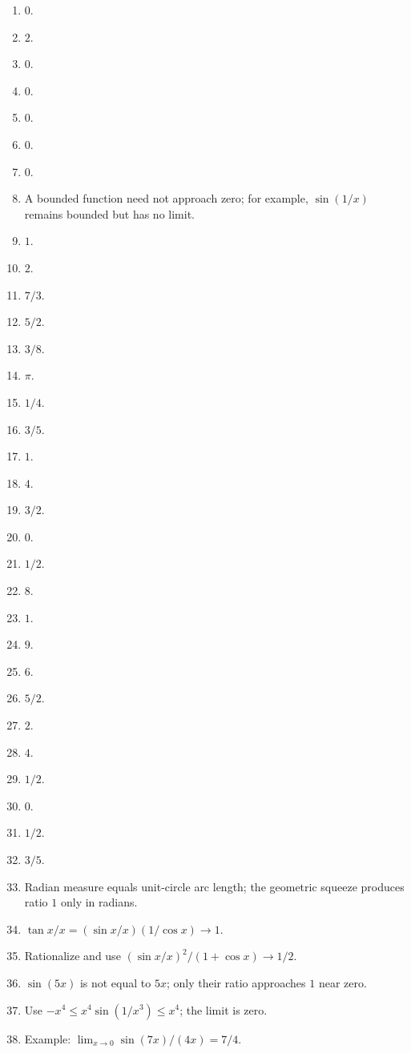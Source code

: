 \begin{enumerate}[label=\textbf{3.\arabic*}]
  \item \(0\).
  \item \(2\).
  \item \(0\).
  \item \(0\).
  \item \(0\).
  \item \(0\).
  \item \(0\).
  \item A bounded function need not approach zero; for example, \(\sin(1/x)\) remains bounded but has no limit.
  \item \(1\).
  \item \(2\).
  \item \(7/3\).
  \item \(5/2\).
  \item \(3/8\).
  \item \(\pi\).
  \item \(1/4\).
  \item \(3/5\).
  \item \(1\).
  \item \(4\).
  \item \(3/2\).
  \item \(0\).
  \item \(1/2\).
  \item \(8\).
  \item \(1\).
  \item \(9\).
  \item \(6\).
  \item \(5/2\).
  \item \(2\).
  \item \(4\).
  \item \(1/2\).
  \item \(0\).
  \item \(1/2\).
  \item \(3/5\).
  \item Radian measure equals unit-circle arc length; the geometric squeeze produces ratio \(1\) only in radians.
  \item \(\tan x/x=(\sin x/x)(1/\cos x)\to1\).
  \item Rationalize and use \((\sin x/x)^2/(1+\cos x)\to1/2\).
  \item \(\sin(5x)\) is not equal to \(5x\); only their ratio approaches \(1\) near zero.
  \item Use \(-x^4\le x^4\sin(1/x^3)\le x^4\); the limit is zero.
  \item Example: \(\lim_{x\to0}\sin(7x)/(4x)=7/4\).
\end{enumerate}

